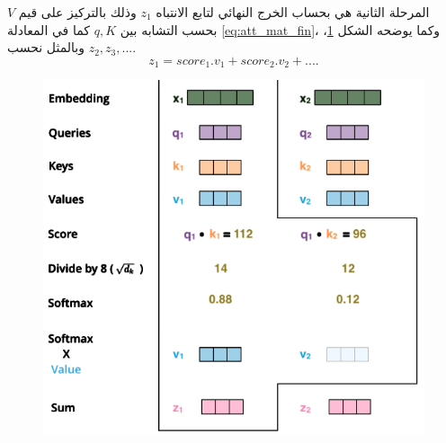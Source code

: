 المرحلة الثانية هي بحساب الخرج النهائي لتابع الانتباه
$z_1$
 وذلك بالتركيز على قيم 
$V$
بحسب التشابه بين 
$q,K$
كما في المعادلة 
\ref{eq:att_mat_fin}،
وكما يوضحه الشكل 
\ref{fig:att_output}،
وبالمثل نحسب
$z_2,z_3,...$.
\begin{equation}
z_1 = score_1.v_1 + score_2.v_2+....
\label{eq:att_mat_fin}
\end{equation}
\begin{figure}[H]
	\centerline{\includegraphics[scale=0.4]{images/attention_output.png}}
	\caption{
		}
	\label{fig:att_output}
\end{figure}
